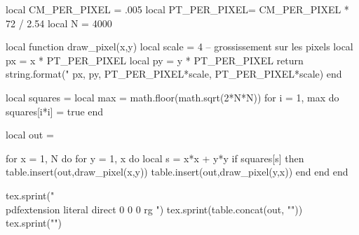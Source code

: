\documentclass{article}
\begin{document}
\pagestyle{empty}
\leavevmode
\begin{luacode*}
local CM_PER_PIXEL  = .005
local PT_PER_PIXEL= CM_PER_PIXEL * 72 / 2.54
local N = 4000

local function draw_pixel(x,y)
	local scale = 4 -- grossissement sur les pixels
    local px = x * PT_PER_PIXEL
    local py = y * PT_PER_PIXEL
    return string.format("%
          px, py, PT_PER_PIXEL*scale, PT_PER_PIXEL*scale)
end


local squares = {}
local max = math.floor(math.sqrt(2*N*N))
for i = 1, max do
  squares[i*i] = true
end

local out = {}

for x = 1, N do
  for y = 1, x do
    local s = x*x + y*y
    if squares[s] then
      table.insert(out,draw_pixel(x,y))
      table.insert(out,draw_pixel(y,x))
    end
  end
end

tex.sprint("\\pdfextension literal direct {0 0 0 rg ")
tex.sprint(table.concat(out, "\n"))
tex.sprint("}")
\end{luacode*}
\end{document}
